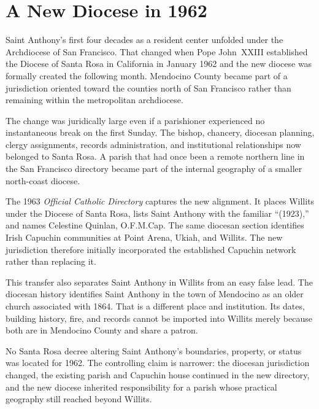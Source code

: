 \section{A New Diocese in 1962}

Saint Anthony's first four decades as a resident center unfolded under the Archdiocese of San Francisco. That changed when Pope John~XXIII established the Diocese of Santa Rosa in California in January 1962 and the new diocese was formally created the following month. Mendocino County became part of a jurisdiction oriented toward the counties north of San Francisco rather than remaining within the metropolitan archdiocese.

The change was juridically large even if a parishioner experienced no instantaneous break on the first Sunday. The bishop, chancery, diocesan planning, clergy assignments, records administration, and institutional relationships now belonged to Santa Rosa. A parish that had once been a remote northern line in the San Francisco directory became part of the internal geography of a smaller north-coast diocese.

The 1963 \emph{Official Catholic Directory} captures the new alignment. It places Willits under the Diocese of Santa Rosa, lists Saint Anthony with the familiar ``(1923),'' and names Celestine Quinlan, O.F.M.Cap. The same diocesan section identifies Irish Capuchin communities at Point Arena, Ukiah, and Willits. The new jurisdiction therefore initially incorporated the established Capuchin network rather than replacing it.

This transfer also separates Saint Anthony in Willits from an easy false lead. The diocesan history identifies Saint Anthony in the town of Mendocino as an older church associated with 1864. That is a different place and institution. Its dates, building history, fire, and records cannot be imported into Willits merely because both are in Mendocino County and share a patron.

No Santa Rosa decree altering Saint Anthony's boundaries, property, or status was located for 1962. The controlling claim is narrower: the diocesan jurisdiction changed, the existing parish and Capuchin house continued in the new directory, and the new diocese inherited responsibility for a parish whose practical geography still reached beyond Willits.

